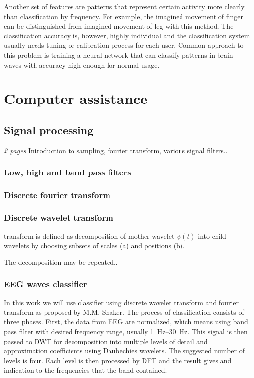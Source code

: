 Another set of features are patterns that represent certain activity more
clearly than classification by frequency. For example, the imagined movement of
finger can be distinguished from imagined movement of leg with this method. The
classification accuracy is, however, highly individual and the classification
system usually needs tuning or calibration process for each user.\cite{bcComm}
Common approach to this problem is training a neural network that can classify
patterns in brain waves with accuracy high enough for normal usage.

\chapter{Computer assistance}
\section{Signal processing}
\label{sec:sigProc}
\emph{2 pages}
Introduction to sampling, fourier transform, various signal filters..
\subsection{Low, high and band pass filters}

\subsection{Discrete fourier transform}

\subsection{Discrete wavelet transform}
transform is defined as decomposition of mother wavelet $\psi(t)$ into child
wavelets by choosing subsets of scales (a) and positions (b). 

The decomposition may be repeated..
\subsection{EEG waves classifier}
In this work we will use classifier using discrete wavelet transform and fourier
transform as proposed by M.M. Shaker. \cite{eegWaveFt} The process of
classification consists of three phases. First, the data from EEG are
normalized, which means using band pass filter with desired frequency range,
usually \SIrange{1}{30}{\Hz}. This signal is then passed to DWT for
decomposition into multiple levels of detail and approximation
coefficients using Daubechies wavelets. The suggested number of levels is four.
Each level is then processed by DFT and the result gives and indication to the
frequencies that the band contained.

